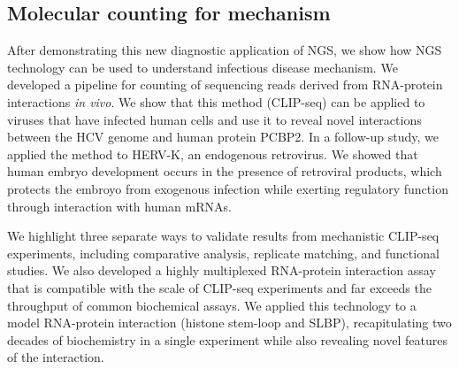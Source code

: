 \subsection{Molecular counting for mechanism}

After demonstrating this new diagnostic application of NGS, we show how NGS technology can be used to understand infectious disease mechanism. We developed a pipeline for counting of sequencing reads derived from RNA-protein interactions \emph{in vivo}. We show that this method (CLIP-seq) can be applied to viruses that have infected human cells and use it to reveal novel interactions between the HCV genome and human protein PCBP2. In a follow-up study, we applied the method to HERV-K, an endogenous retrovirus. We showed that human embryo development occurs in the presence of retroviral products, which protects the embroyo from exogenous infection while exerting regulatory function through interaction with human mRNAs. 

We highlight three separate ways to validate results from mechanistic CLIP-seq experiments, including comparative analysis, replicate matching, and functional studies. We also developed a highly multiplexed RNA-protein interaction assay that is compatible with the scale of CLIP-seq experiments and far exceeds the throughput of common biochemical assays. We applied this technology to a model RNA-protein interaction (histone stem-loop and SLBP), recapitulating two decades of biochemistry in a single experiment while also revealing novel features of the interaction.  